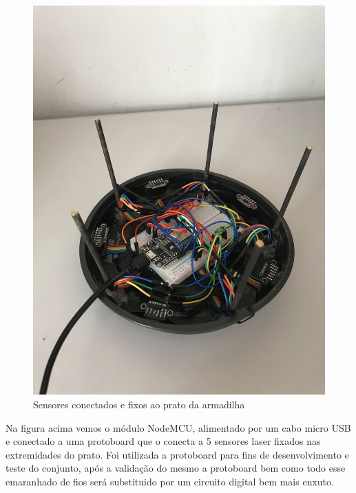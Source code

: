 \documentclass[
	12pt,				%
	openright,			%
	oneside,			%
	a4paper,			%
	chapter=TITLE,		%
	english,			%
	brazil				%
	]{abntex2}
\begin{document}
\begin{figure}[H]
    \centering
    \includegraphics[scale=0.09, angle=-90]{imagens/IMG_0606.jpg}
    \caption{Sensores conectados e fixos ao prato da armadilha}
    \label{fig:hardwareprato}
\end{figure}   

Na figura acima vemos o módulo NodeMCU, alimentado por um cabo micro USB e conectado a uma protoboard que o conecta a 5 sensores laser
fixados nas extremidades do prato. Foi utilizada a protoboard para fins de desenvolvimento e teste do conjunto, após a validação do mesmo
a protoboard bem como todo esse emaranhado de fios será substituido por um circuito digital bem mais enxuto. 
\end{document}
